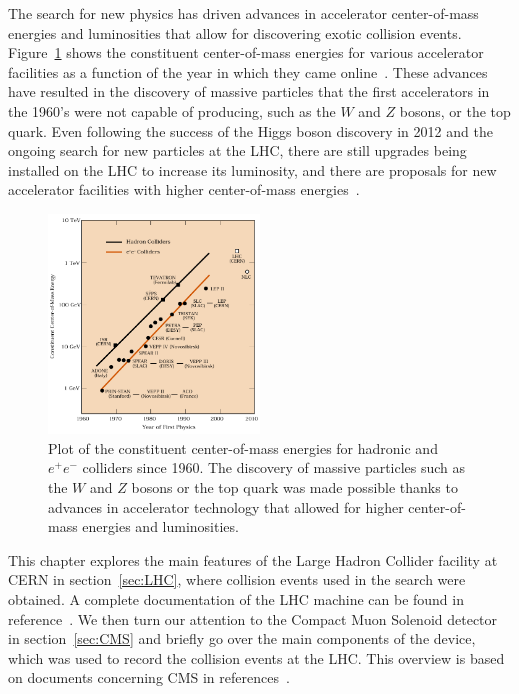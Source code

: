 The search for new physics has driven advances in accelerator center-of-mass energies and luminosities that allow for discovering exotic collision events.
Figure~\ref{fig:ECMplot} shows the constituent center-of-mass energies for various accelerator facilities as a function of the year in which they came online~\cite{Panofsky}.
These advances have resulted in the discovery of massive particles that the first accelerators in the 1960's were not capable of producing, such as the $W$ and $Z$ bosons, or the top quark. %
Even following the success of the Higgs boson discovery in 2012 and the ongoing search for new particles at the LHC, there are still upgrades being installed on the LHC to increase its luminosity, and there are proposals for new accelerator facilities with higher center-of-mass energies~\cite{Bicer_2014}.

\begin{figure}[htbp]
  \centering
  \includegraphics[width=0.5\textwidth]{fig/experiment/ecm_livingston.pdf}
  \caption{
    Plot of the constituent center-of-mass energies for hadronic and $e^+e^-$ colliders since 1960.
    The discovery of massive particles such as the $W$ and $Z$ bosons or the top quark was made possible thanks to advances in accelerator technology that allowed for higher center-of-mass energies and luminosities.
  }
  \label{fig:ECMplot}
\end{figure}

This chapter explores the main features of the Large Hadron Collider facility at CERN in section~\ref{sec:LHC}, where collision events used in the search were obtained.
A complete documentation of the LHC machine can be found in reference~\cite{Evans:1129806}.
We then turn our attention to the Compact Muon Solenoid detector in section~\ref{sec:CMS} and briefly go over the main components of the device, which was used to record the collision events at the LHC.
This overview is based on documents concerning CMS in references~\cite{Chatrchyan:1129810,taylor_2011}.

